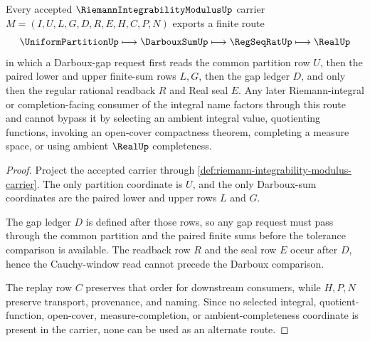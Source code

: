 \begin{theorem}
\label{thm:riemann-integrability-modulus-darboux-cauchy-handoff}
Every accepted $\RiemannIntegrabilityModulusUp$ carrier $M=(I,U,L,G,D,R,E,H,C,P,N)$ exports a finite route
$$
\UniformPartitionUp \longmapsto \DarbouxSumUp \longmapsto \RegSeqRatUp \longmapsto \RealUp
$$
in which a Darboux-gap request first reads the common partition row $U$, then the paired lower and upper finite-sum rows $L,G$, then the gap ledger $D$, and only then the regular rational readback $R$ and Real seal $E$. Any later Riemann-integral or completion-facing consumer of the integral name factors through this route and cannot bypass it by selecting an ambient integral value, quotienting functions, invoking an open-cover compactness theorem, completing a measure space, or using ambient $\RealUp$ completeness.
\end{theorem}
\begin{proof}
Project the accepted carrier through \autoref{def:riemann-integrability-modulus-carrier}. The only partition coordinate is $U$, and the only Darboux-sum coordinates are the paired lower and upper rows $L$ and $G$.

The gap ledger $D$ is defined after those rows, so any gap request must pass through the common partition and the paired finite sums before the tolerance comparison is available. The readback row $R$ and the seal row $E$ occur after $D$, hence the Cauchy-window read cannot precede the Darboux comparison.

The replay row $C$ preserves that order for downstream consumers, while $H,P,N$ preserve transport, provenance, and naming. Since no selected integral, quotient-function, open-cover, measure-completion, or ambient-completeness coordinate is present in the carrier, none can be used as an alternate route.
\end{proof}


